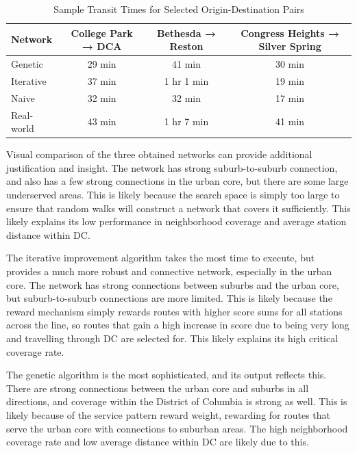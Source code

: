 \documentclass[sigconf,nonacm]{acmart}
\begin{document}
\begin{table}[h]
\caption{Sample Transit Times for Selected Origin-Destination Pairs}
\label{tab:transittimes}
\begin{tabular}{lccc}
\toprule
\textbf{Network} & \textbf{College Park → DCA} & \textbf{Bethesda → Reston} & \textbf{Congress Heights → Silver Spring} \\
\midrule
Genetic & 29 min & 41 min & 30 min \\
Iterative & 37 min & 1 hr 1 min & 19 min \\
Naive & 32 min & 32 min & 17 min \\
\midrule
Real-world & 43 min & 1 hr 7 min & 41 min \\
\bottomrule
\end{tabular}
\end{table}

Visual comparison of the three obtained networks can provide additional justification and insight. The network has strong suburb-to-suburb connection, and also has a few strong connections in the urban core, but there are some large underserved areas. This is likely because the search space is simply too large to ensure that random walks will construct a network that covers it sufficiently. This likely explains its low performance in neighborhood coverage and average station distance within DC.

The iterative improvement algorithm takes the most time to execute, but provides a much more robust and connective network, especially in the urban core. The network has strong connections between suburbs and the urban core, but suburb-to-suburb connections are more limited. This is likely because the reward mechanism simply rewards routes with higher score sums for all stations across the line, so routes that gain a high increase in score due to being very long and travelling through DC are selected for. This likely explains its high critical coverage rate.

The genetic algorithm is the most sophisticated, and its output reflects this. There are strong connections between the urban core and suburbs in all directions, and coverage within the District of Columbia is strong as well. This is likely because of the service pattern reward weight, rewarding for routes that serve the urban core with connections to suburban areas. The high neighborhood coverage rate and low average distance within DC are likely due to this.
\end{document}
